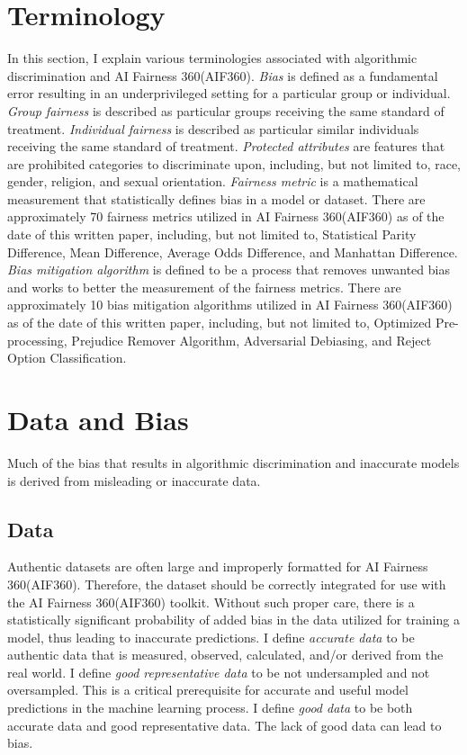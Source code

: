 \documentclass{article}
\begin{document}
\section{Terminology}

In this section, I explain various terminologies associated with algorithmic discrimination and AI Fairness 360(AIF360). \textit{Bias} is defined as a fundamental error resulting in an underprivileged setting for a particular group or individual. \textit{Group fairness} is described as particular groups receiving the same standard of treatment. \textit{Individual fairness} is described as particular similar individuals receiving the same standard of treatment.  \textit{Protected attributes} are features that are prohibited categories to discriminate upon, including, but not limited to, race, gender, religion, and sexual orientation. \textit{Fairness metric} is a mathematical measurement that statistically defines bias in a model or dataset. There are approximately 70 fairness metrics utilized in AI Fairness 360(AIF360) as of the date of this written paper, including, but not limited to, Statistical Parity Difference, Mean Difference, Average Odds Difference, and Manhattan Difference. \textit{Bias mitigation algorithm} is defined to be a process that removes unwanted bias and works to better the measurement of the fairness metrics. There are approximately 10 bias mitigation algorithms utilized in AI Fairness 360(AIF360) as of the date of this written paper, including, but not limited to, Optimized Pre-processing, Prejudice Remover Algorithm, Adversarial Debiasing, and Reject Option Classification. 

\section{Data and Bias}

Much of the bias that results in algorithmic discrimination and inaccurate models is derived from misleading or inaccurate data. 

\subsection{Data}

Authentic datasets are often large and improperly formatted for AI Fairness 360(AIF360). Therefore, the dataset should be correctly integrated for use with the AI Fairness 360(AIF360) toolkit. Without such proper care, there is a statistically significant probability of added bias in the data utilized for training a model, thus leading to inaccurate predictions. I define \textit{accurate data} to be authentic data that is measured, observed, calculated, and/or derived from the real world. I define \textit{good representative data} to be not undersampled and not oversampled. This is a critical prerequisite for accurate and useful model predictions in the machine learning process. I define \textit{good data} to be both accurate data and good representative data. The lack of good data can lead to bias. 
\end{document}

